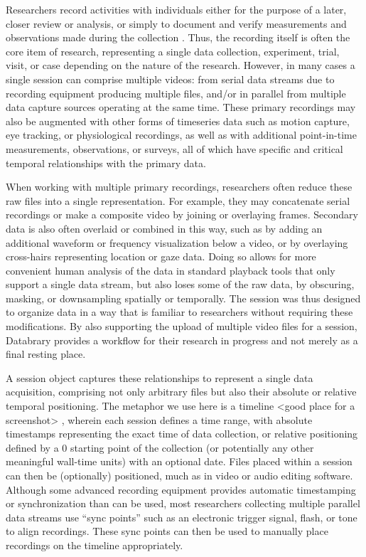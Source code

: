 \documentclass{sig-alternate}
\begin{document}
Researchers record activities with individuals either for the purpose of a later, closer review or analysis, or simply to document and verify measurements and observations made during the collection \cite{Bakeman_2012}.
Thus, the recording itself is often the core item of research, representing a single data collection, experiment, trial, visit, or case depending on the nature of the research.
However, in many cases a single session can comprise multiple videos: from serial data streams due to recording equipment producing multiple files, and/or in parallel from multiple data capture sources operating at the same time.
These primary recordings may also be augmented with other forms of timeseries data such as motion capture, eye tracking, or physiological recordings, as well as with additional point-in-time measurements, observations, or surveys, all of which have specific and critical temporal relationships with the primary data. 

When working with multiple primary recordings, researchers often reduce these raw files into a single representation.
For example, they may concatenate serial recordings or make a composite video by joining or overlaying frames.
Secondary data is also often overlaid or combined in this way, such as by adding an additional waveform or frequency visualization below a video, or by overlaying cross-hairs representing location or gaze data.
Doing so allows for more convenient human analysis of the data in standard playback tools that only support a single data stream, but also loses some of the raw data, by obscuring, masking, or downsampling spatially or temporally.
The session was thus designed to organize data in a way that is familiar to researchers without requiring these modifications. By also supporting the upload of multiple video files for a session, Databrary provides a workflow for their research in progress and not merely as a final resting place.

A session object captures these relationships to represent a single data acquisition, comprising not only arbitrary files but also their absolute or relative temporal positioning.
The metaphor we use here is a timeline <good place for a screenshot> , wherein each session defines a time range, with absolute timestamps representing the exact time of data collection, or relative positioning defined by a 0 starting point of the collection (or potentially any other meaningful wall-time units) with an optional date.
Files placed within a session can then be (optionally) positioned, much as in video or audio editing software.
Although some advanced recording equipment provides automatic timestamping or synchronization than can be used, most researchers collecting multiple parallel data streams use ``sync points'' such as an electronic trigger signal, flash, or tone to align recordings.
These sync points can then be used to manually place recordings on the timeline appropriately.
\end{document}
